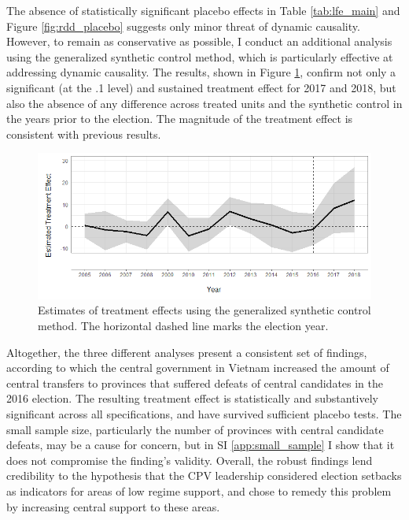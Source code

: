 \documentclass[12pt]{article}
\newcommand{\1}{\mathbbm{1}}
\begin{document}
The absence of statistically significant placebo effects in Table \ref{tab:lfe_main} and Figure \ref{fig:rdd_placebo} suggests only minor threat of dynamic causality. However, to remain as conservative as possible, I conduct an additional analysis using the generalized synthetic control method, which is particularly effective at addressing dynamic causality. The results, shown in Figure \ref{fig:synth_placebo}, confirm not only a significant (at the .1 level) and sustained treatment effect for 2017 and 2018, but also the absence of any difference across treated units and the synthetic control in the years prior to the election. The magnitude of the treatment effect is consistent with previous results.

\begin{figure}[!htbp]
	\centering
	\includegraphics[width=\textwidth]{figure/200422_synth_results.png}
	\captionsetup{singlelinecheck=off}
	\caption[Estimated synthetic control treatment effects]{Estimates of treatment effects using the generalized synthetic control method. The horizontal dashed line marks the election year.}
	\label{fig:synth_placebo}
\end{figure}

Altogether, the three different analyses present a consistent set of findings, according to which the central government in Vietnam increased the amount of central transfers to provinces that suffered defeats of central candidates in the 2016 election. The resulting treatment effect is statistically and substantively significant across all specifications, and have survived sufficient placebo tests. The small sample size, particularly the number of provinces with central candidate defeats, may be a cause for concern, but in SI \ref{app:small_sample} I show that it does not compromise the finding's validity. Overall, the robust findings lend credibility to the hypothesis that the CPV leadership considered election setbacks as indicators for areas of low regime support, and chose to remedy this problem by increasing central support to these areas.
\end{document}
